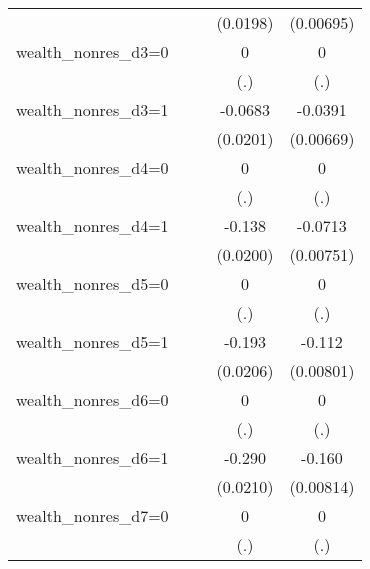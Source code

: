 \begin{table}[htbp]
\begin{tabular}{l*{4}{c}}
                &                  &                  & (0.0198)         &(0.00695)         \\
wealth\_nonres\_d3=0&                  &                  &        0         &        0         \\
                &                  &                  &      (.)         &      (.)         \\
wealth\_nonres\_d3=1&                  &                  &  -0.0683\sym{***}&  -0.0391\sym{***}\\
                &                  &                  & (0.0201)         &(0.00669)         \\
wealth\_nonres\_d4=0&                  &                  &        0         &        0         \\
                &                  &                  &      (.)         &      (.)         \\
wealth\_nonres\_d4=1&                  &                  &   -0.138\sym{***}&  -0.0713\sym{***}\\
                &                  &                  & (0.0200)         &(0.00751)         \\
wealth\_nonres\_d5=0&                  &                  &        0         &        0         \\
                &                  &                  &      (.)         &      (.)         \\
wealth\_nonres\_d5=1&                  &                  &   -0.193\sym{***}&   -0.112\sym{***}\\
                &                  &                  & (0.0206)         &(0.00801)         \\
wealth\_nonres\_d6=0&                  &                  &        0         &        0         \\
                &                  &                  &      (.)         &      (.)         \\
wealth\_nonres\_d6=1&                  &                  &   -0.290\sym{***}&   -0.160\sym{***}\\
                &                  &                  & (0.0210)         &(0.00814)         \\
wealth\_nonres\_d7=0&                  &                  &        0         &        0         \\
                &                  &                  &      (.)         &      (.)         \\

\end{tabular}
\end{table}
